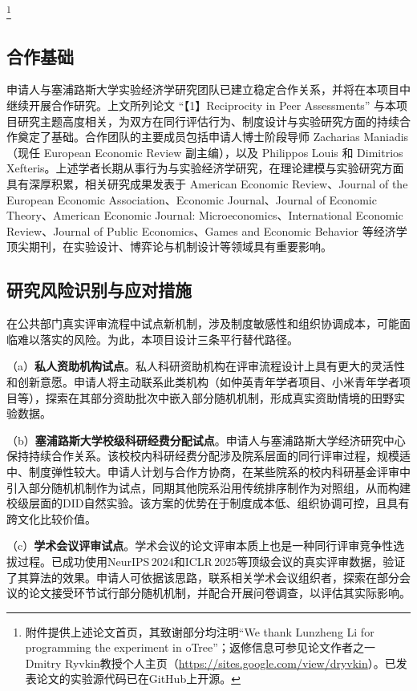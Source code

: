 \footnote{附件提供上述论文首页，其致谢部分均注明“We thank Lunzheng Li for programming the experiment in oTree”；返修信息可参见论文作者之一Dmitry Ryvkin教授个人主页（\url{https://sites.google.com/view/dryvkin}）。已发表论文的实验源代码已在GitHub上开源。}

\subsection{\textbf{合作基础}}

申请人与塞浦路斯大学实验经济学研究团队已建立稳定合作关系，并将在本项目中继续开展合作研究。上文所列论文 “【1】Reciprocity in Peer Assessments” 与本项目研究主题高度相关，为双方在同行评估行为、制度设计与实验研究方面的持续合作奠定了基础。合作团队的主要成员包括申请人博士阶段导师 Zacharias Maniadis（现任 European Economic Review 副主编），以及 Philippos Louis 和 Dimitrios Xefteris。上述学者长期从事行为与实验经济学研究，在理论建模与实验研究方面具有深厚积累，相关研究成果发表于 American Economic Review、Journal of the European Economic Association、Economic Journal、Journal of Economic Theory、American Economic Journal: Microeconomics、International Economic Review、Journal of Public Economics、Games and Economic Behavior 等经济学顶尖期刊，在实验设计、博弈论与机制设计等领域具有重要影响。


\subsection{\textbf{研究风险识别与应对措施}}

在公共部门真实评审流程中试点新机制，涉及制度敏感性和组织协调成本，可能面临难以落实的风险。为此，本项目设计三条平行替代路径。

（a）\textbf{私人资助机构试点}。私人科研资助机构在评审流程设计上具有更大的灵活性和创新意愿。申请人将主动联系此类机构（如仲英青年学者项目、小米青年学者项目等），探索在其部分资助批次中嵌入部分随机机制，形成真实资助情境的田野实验数据。

（b）\textbf{塞浦路斯大学校级科研经费分配试点}。申请人与塞浦路斯大学经济研究中心保持持续合作关系。该校校内科研经费分配涉及院系层面的同行评审过程，规模适中、制度弹性较大。申请人计划与合作方协商，在某些院系的校内科研基金评审中引入部分随机机制作为试点，同期其他院系沿用传统排序制作为对照组，从而构建校级层面的DID自然实验。该方案的优势在于制度成本低、组织协调可控，且具有跨文化比较价值。

（c）\textbf{学术会议评审试点}。学术会议的论文评审本质上也是一种同行评审竞争性选拔过程。\cite{goldbergPrincipledApproachRandomized2025}已成功使用NeurIPS 2024和ICLR 2025等顶级会议的真实评审数据，验证了其算法的效果。申请人可依据该思路，联系相关学术会议组织者，探索在部分会议的论文接受环节试行部分随机机制，并配合开展问卷调查，以评估其实际影响。